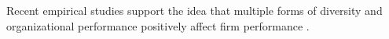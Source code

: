 \documentclass[12pt]{article}
\begin{document}
Recent empirical studies support the idea that multiple forms of diversity and organizational performance positively affect firm performance \citep{zhou2015entrepreneurial}.





\end{document}
